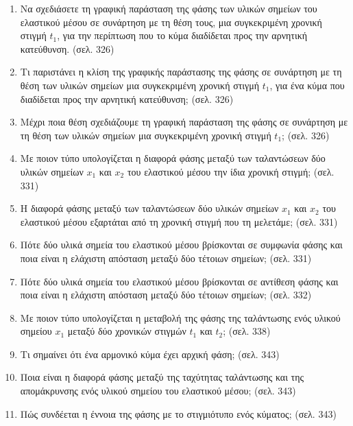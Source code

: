 \documentclass{article}
\begin{document}
\begin{enumerate}
      \item Να σχεδιάσετε τη γραφική παράσταση της φάσης των υλικών σημείων του ελαστικού μέσου σε συνάρτηση με τη θέση τους, μια συγκεκριμένη χρονική στιγμή $t_1$, για την περίπτωση που το κύμα διαδίδεται προς την αρνητική κατεύθυνση. (σελ. 326)

      \item Τι παριστάνει η κλίση της γραφικής παράστασης της φάσης σε συνάρτηση με τη θέση των υλικών σημείων μια συγκεκριμένη χρονική στιγμή $t_1$, για ένα κύμα που διαδίδεται προς την αρνητική κατεύθυνση; (σελ. 326)

      \item Μέχρι ποια θέση σχεδιάζουμε τη γραφική παράσταση της φάσης σε συνάρτηση με τη θέση των υλικών σημείων μια συγκεκριμένη χρονική στιγμή $t_1$; (σελ. 326)

      \item Με ποιον τύπο υπολογίζεται η διαφορά φάσης μεταξύ των ταλαντώσεων δύο υλικών σημείων $x_1$ και $x_2$ του ελαστικού μέσου την ίδια χρονική στιγμή; (σελ. 331)

      \item Η διαφορά φάσης μεταξύ των ταλαντώσεων δύο υλικών σημείων $x_1$ και $x_2$ του ελαστικού μέσου εξαρτάται από τη χρονική στιγμή που τη μελετάμε; (σελ. 331)

      \item Πότε δύο υλικά σημεία του ελαστικού μέσου βρίσκονται σε συμφωνία φάσης και ποια είναι η ελάχιστη απόσταση μεταξύ δύο τέτοιων σημείων; (σελ. 331)

      \item Πότε δύο υλικά σημεία του ελαστικού μέσου βρίσκονται σε αντίθεση φάσης και ποια είναι η ελάχιστη απόσταση μεταξύ δύο τέτοιων σημείων; (σελ. 332)

      \item Με ποιον τύπο υπολογίζεται η μεταβολή της φάσης της ταλάντωσης ενός υλικού σημείου $x_1$ μεταξύ δύο χρονικών στιγμών $t_1$ και $t_2$; (σελ. 338)

      \item Τι σημαίνει ότι ένα αρμονικό κύμα έχει αρχική φάση; (σελ. 343)

      \item Ποια είναι η διαφορά φάσης μεταξύ της ταχύτητας ταλάντωσης και της απομάκρυνσης ενός υλικού σημείου του ελαστικού μέσου; (σελ. 343)

      \item Πώς συνδέεται η έννοια της φάσης με το στιγμιότυπο ενός κύματος; (σελ. 343)
\end{enumerate}
\end{document}
